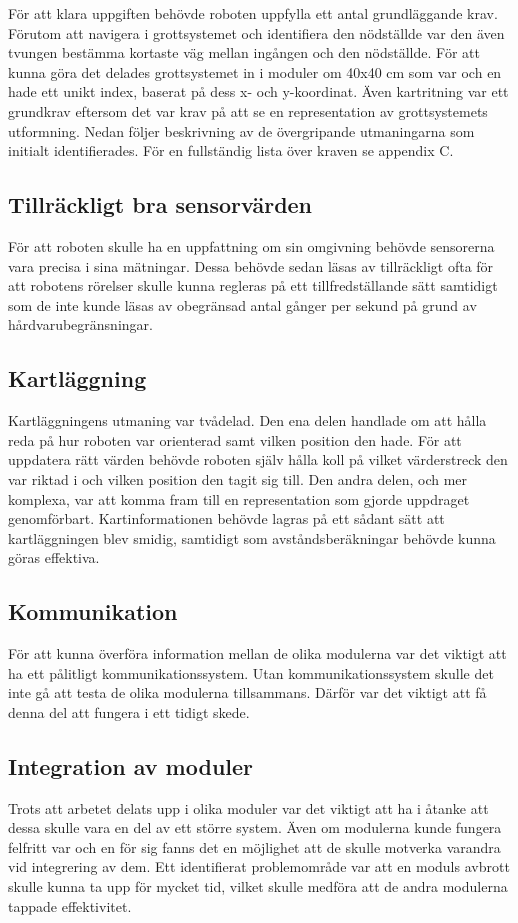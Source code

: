 \documentclass[11pt]{article}
\begin{document}
\begin{flushleft}
För att klara uppgiften behövde roboten uppfylla ett antal grundläggande krav. Förutom att navigera i grottsystemet och identifiera den nödställde var den även tvungen bestämma kortaste väg mellan ingången och den nödställde. För att kunna göra det delades grottsystemet in i moduler om 40x40 cm som var och en hade ett unikt index, baserat på dess x- och y-koordinat. Även kartritning var ett grundkrav eftersom det var krav på att se en representation av grottsystemets utformning. Nedan följer beskrivning av de övergripande utmaningarna som initialt identifierades. För en fullständig lista över kraven se appendix C.

\subsection{Tillräckligt bra sensorvärden}
För att roboten skulle ha en uppfattning om sin omgivning behövde sensorerna vara precisa i sina mätningar. Dessa behövde sedan läsas av tillräckligt ofta för att robotens rörelser skulle kunna regleras på ett tillfredställande sätt samtidigt som de inte kunde läsas av obegränsad antal gånger per sekund på grund av hårdvarubegränsningar.

\subsection{Kartläggning}
Kartläggningens utmaning var tvådelad. Den ena delen handlade om att hålla reda på hur roboten var orienterad samt vilken position den hade. För att uppdatera rätt värden behövde roboten själv hålla koll på vilket värderstreck den var riktad i och vilken position den tagit sig till. Den andra delen, och mer komplexa, var att komma fram till en representation som gjorde uppdraget genomförbart. Kartinformationen behövde lagras på ett sådant sätt att kartläggningen blev smidig, samtidigt som avståndsberäkningar behövde kunna göras effektiva.

\subsection{Kommunikation}
För att kunna överföra information mellan de olika modulerna var det viktigt att ha ett pålitligt kommunikationssystem. Utan kommunikationssystem skulle det inte gå att testa de olika modulerna tillsammans. Därför var det viktigt att få denna del att fungera i ett tidigt skede.

\subsection{Integration av moduler}
Trots att arbetet delats upp i olika moduler var det viktigt att ha i åtanke att dessa skulle vara en del av ett större system. Även om modulerna kunde fungera felfritt var och en för sig fanns det en möjlighet att de skulle motverka varandra vid integrering av dem. Ett identifierat problemområde var att en moduls avbrott skulle kunna ta upp för mycket tid, vilket skulle medföra att de andra modulerna tappade effektivitet. 


\end{flushleft}
\end{document}
